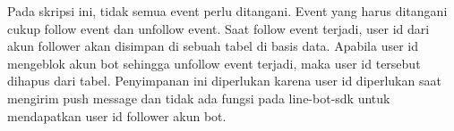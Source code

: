 	Pada skripsi ini, tidak semua event perlu ditangani. Event yang harus ditangani cukup follow event dan unfollow event. Saat follow event terjadi, user id dari akun follower akan disimpan di sebuah tabel di basis data. Apabila user id mengeblok akun bot sehingga unfollow event terjadi, maka user id tersebut dihapus dari tabel. Penyimpanan ini diperlukan karena user id diperlukan saat mengirim push message dan tidak ada fungsi pada line-bot-sdk untuk mendapatkan user id follower akun bot.
